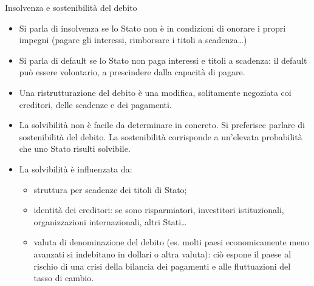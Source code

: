\documentclass[aspectratio=149,11pt,italian]{beamer}
\begin{document}
\begin{frame}{Insolvenza e sostenibilità del debito}

  \begin{itemize}
  \item Si parla di \alert{insolvenza} se lo Stato non è in condizioni di
    onorare i propri impegni (pagare gli interessi, rimborsare i titoli a
    scadenza\ldots{})
  \item Si parla di \alert{default} se lo Stato non paga interessi e titoli a
    scadenza: il default può essere volontario, a prescindere dalla capacità
    di pagare.
  \item Una \alert{ristrutturazione} del debito è una modifica, solitamente
    negoziata coi creditori, delle scadenze e dei pagamenti.
  \item La \alert{solvibilità} non è facile da determinare in concreto. Si
    preferisce parlare di \alert{sostenibilità} del debito. La sostenibilità
    corrisponde a un'elevata probabilità che uno Stato risulti solvibile.
  \item La solvibilità è influenzata da:
    \begin{itemize}
    \item struttura per scadenze dei titoli di Stato;
    \item identità dei creditori: se sono risparmiatori, investitori
      istituzionali, organizzazioni internazionali, altri Stati\ldots{}
    \item valuta di denominazione del debito (es. molti paesi economicamente
      meno avanzati si indebitano in dollari o altra valuta): ciò espone il
      paese al rischio di una crisi della bilancia dei pagamenti e alle
      fluttuazioni del tasso di cambio.
    \end{itemize}
  \end{itemize}
\end{frame}
\end{document}

